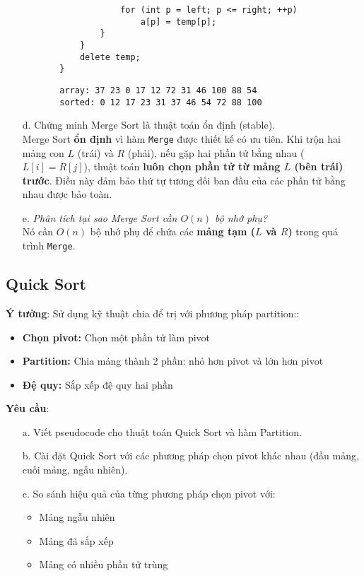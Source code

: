 \documentclass[12pt,a4paper]{article}
\begin{document}
\begin{enumerate}
\begin{itemize}
\begin{verbatim}
                for (int p = left; p <= right; ++p)
                    a[p] = temp[p];
            }
        }
        delete temp;
    }
    \end{verbatim}

    \begin{verbatim}
    array: 37 23 0 17 12 72 31 46 100 88 54
    sorted: 0 12 17 23 31 37 46 54 72 88 100
    \end{verbatim}

    \end{itemize}

    \item[d.] Chứng minh Merge Sort là thuật toán ổn định (stable). \\
    Merge Sort \textbf{ổn định} vì hàm \texttt{Merge} được thiết kế có ưu tiên. 
    Khi trộn hai mảng con $L$ (trái) và $R$ (phải), nếu gặp hai phần tử bằng nhau 
    ($L[i] = R[j]$), thuật toán \textbf{luôn chọn phần tử từ mảng $L$ (bên trái) trước}. 
    Điều này đảm bảo thứ tự tương đối ban đầu của các phần tử bằng nhau được bảo toàn. 
    
    \item[e.] \textit{Phân tích tại sao Merge Sort cần $O(n)$ bộ nhớ phụ?} \\
    Nó cần \textbf{$O(n)$} bộ nhớ phụ để chứa các \textbf{mảng tạm ($L$ và $R$)} 
    trong quá trình \texttt{Merge}.
\end{enumerate}

\subsection{Quick Sort}
\textbf{Ý tưởng}: Sử dụng kỹ thuật chia để trị với phương pháp partition::
\begin{itemize}
    \item \textbf{Chọn pivot:} Chọn một phần tử làm pivot
    \item \textbf{Partition:} Chia mảng thành 2 phần: nhỏ hơn pivot và lớn hơn pivot
    \item \textbf{Đệ quy:} Sắp xếp đệ quy hai phần
\end{itemize}

\textbf{Yêu cầu}:
\begin{enumerate}
    \item[a.] Viết pseudocode cho thuật toán Quick Sort và hàm Partition.
    \item[b.] Cài đặt Quick Sort với các phương pháp chọn pivot khác nhau 
              (đầu mảng, cuối mảng, ngẫu nhiên).
    \item[c.] So sánh hiệu quả của từng phương pháp chọn pivot với:
        \begin{itemize}
            \item Mảng ngẫu nhiên
            \item Mảng đã sắp xếp
            \item Mảng có nhiều phần tử trùng
        \end{itemize}
\end{enumerate}
\end{document}
